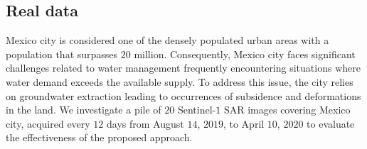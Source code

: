 \subsection{Real data}
\label{subsection:real_data}
    \noindent
    Mexico city is considered one of the densely populated urban areas with a population that surpasses $20$ million. Consequently, Mexico city faces significant challenges related to water management frequently encountering situations where water demand exceeds the available supply.  To address this issue, the city relies on groundwater extraction leading to occurrences of subsidence and deformations in the land. We investigate a pile of $20$ Sentinel-$1$ \acs{SAR} images covering Mexico city, acquired every $12$ days from August $14$, $2019$, to April $10$, $2020$ to evaluate the effectiveness of the proposed approach.
    \vspace{-0.5cm}
